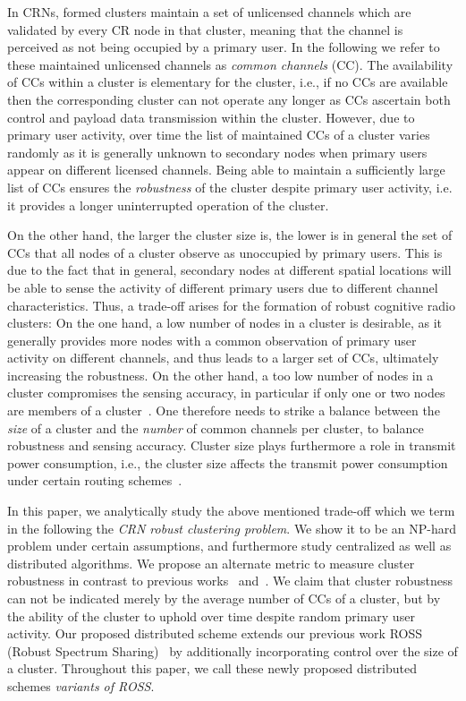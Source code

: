 \documentclass[times]{ettauth}
\newcommand{\ie}{i.e., }
\theoremstyle{mytheoremstyle}
\theoremstyle{mytheoremstyle}
\theoremstyle{mytheoremstyle}
\begin{document}
In CRNs, formed clusters maintain a set of unlicensed channels which are validated by every CR node in that cluster, meaning that the channel is perceived as not being occupied by a primary user.
In the following we refer to these maintained unlicensed channels as \textit{common channels} (CC).
The availability of CCs within a cluster is elementary for the cluster, \ie if no CCs are available then the corresponding cluster can not operate any longer as CCs ascertain both control and payload data transmission within the cluster.
However, due to primary user activity, over time the list of maintained CCs of a cluster varies randomly as it is generally unknown to secondary nodes when primary users appear on different licensed channels. 
Being able to maintain a sufficiently large list of CCs ensures the \textit{robustness} of the cluster despite primary user activity, i.e. it provides a longer uninterrupted operation of the cluster.

On the other hand, the larger the cluster size is, the lower is in general the set of CCs that all nodes of a cluster observe as unoccupied by primary users.
This is due to the fact that in general, secondary nodes at different spatial locations will be able to sense the activity of different primary users due to different channel characteristics. 
Thus, a trade-off arises for the formation of robust cognitive radio clusters:
On the one hand, a low number of nodes in a cluster is desirable, as it generally provides more nodes with a common observation of primary user activity on different channels, and thus leads to a larger set of CCs, ultimately increasing the robustness. 
On the other hand, a too low number of nodes in a cluster compromises the sensing accuracy, in particular if only one or two nodes are members of a cluster~\cite{Consensus_based_clustering12}.
One therefore needs to strike a balance between the \textit{size} of a cluster and the \textit{number} of common channels per cluster, to balance robustness and sensing accuracy.
Cluster size plays furthermore a role in transmit power consumption, \ie the cluster size affects the transmit power consumption under certain routing schemes~\cite{clustering_globecom11, EnergyEfficientClusteringRouting_2015}.

In this paper, we analytically study the above mentioned trade-off which we term in the following the \textit{CRN robust clustering problem}.
We show it to be an NP-hard problem under certain assumptions, and furthermore study centralized as well as distributed algorithms.
We propose an alternate metric to measure cluster robustness in contrast to previous works~\cite{Li11_ROSS} and~\cite{LIU_TMC11_2}.
We claim that cluster robustness can not be indicated merely by the average number of CCs of a cluster, but by the ability of the cluster to uphold over time despite random primary user activity.
Our proposed distributed scheme extends our previous work ROSS (Robust Spectrum Sharing)~\cite{Li11_ROSS} by additionally incorporating control over the size of a cluster.
Throughout this paper, we call these newly proposed distributed schemes \textit{variants of ROSS}.
%
\end{document}
